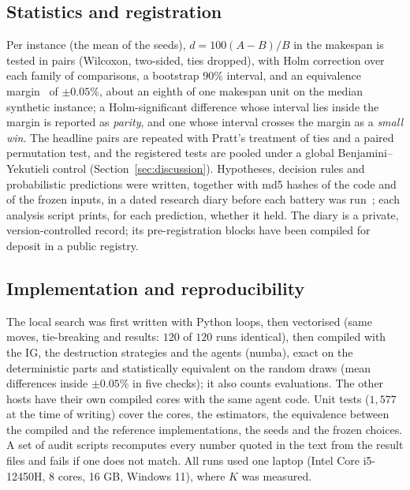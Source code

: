 \subsection{Statistics and registration}
\label{sec:stats}
Per instance (the mean of the seeds), $d=100(A-B)/B$ in the makespan is tested in pairs (Wilcoxon, two-sided, ties dropped), with Holm correction over each family of comparisons, a bootstrap $90\%$ interval, and an equivalence margin~\cite{Lakens2017} of $\pm0.05\%$, about an eighth of one makespan unit on the median synthetic instance; a Holm-significant difference whose interval lies inside the margin is reported as \emph{parity}, and one whose interval crosses the margin as a \emph{small win}. The headline pairs are repeated with Pratt's treatment of ties and a paired permutation test, and the registered tests are pooled under a global Benjamini--Yekutieli control (Section~\ref{sec:discussion}). Hypotheses, decision rules and probabilistic predictions were written, together with md5 hashes of the code and of the frozen inputs, in a dated research diary before each battery was run~\cite{NosekEtal2018}; each analysis script prints, for each prediction, whether it held. The diary is a private, version-controlled record; its pre-registration blocks have been compiled for deposit in a public registry.

\subsection{Implementation and reproducibility}
\label{sec:impl}
The local search was first written with Python loops, then vectorised (same moves, tie-breaking and results: $120$ of $120$ runs identical), then compiled with the IG, the destruction strategies and the agents (numba), exact on the deterministic parts and statistically equivalent on the random draws (mean differences inside $\pm0.05\%$ in five checks); it also counts evaluations. The other hosts have their own compiled cores with the same agent code. Unit tests ($1{,}577$ at the time of writing) cover the cores, the estimators, the equivalence between the compiled and the reference implementations, the seeds and the frozen choices. A set of audit scripts recomputes every number quoted in the text from the result files and fails if one does not match. All runs used one laptop (Intel Core i5-12450H, 8 cores, 16 GB, Windows 11), where $K$ was measured.
